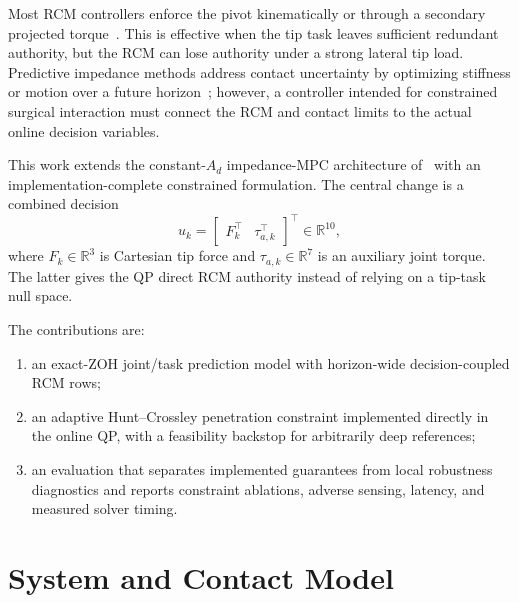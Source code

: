 Most RCM controllers enforce the pivot kinematically or through a secondary projected torque~\cite{aghakhani2013,sandoval2018}. This is effective when the tip task leaves sufficient redundant authority, but the RCM can lose authority under a strong lateral tip load. Predictive impedance methods address contact uncertainty by optimizing stiffness or motion over a future horizon~\cite{roveda2025,anand2022}; however, a controller intended for constrained surgical interaction must connect the RCM and contact limits to the actual online decision variables.

This work extends the constant-$A_d$ impedance-MPC architecture of~\cite{cao2026phri} with an implementation-complete constrained formulation. The central change is a combined decision
\begin{equation}
u_k = \begin{bmatrix}F_k^\top & \tau_{a,k}^\top\end{bmatrix}^\top\in\mathbb{R}^{10},
\end{equation}
where $F_k\in\mathbb{R}^3$ is Cartesian tip force and $\tau_{a,k}\in\mathbb{R}^7$ is an auxiliary joint torque. The latter gives the QP direct RCM authority instead of relying on a tip-task null space.

The contributions are:
\begin{enumerate}
\item an exact-ZOH joint/task prediction model with horizon-wide decision-coupled RCM rows;
\item an adaptive Hunt--Crossley penetration constraint implemented directly in the online QP, with a feasibility backstop for arbitrarily deep references;
\item an evaluation that separates implemented guarantees from local robustness diagnostics and reports constraint ablations, adverse sensing, latency, and measured solver timing.
\end{enumerate}

\section{System and Contact Model}


